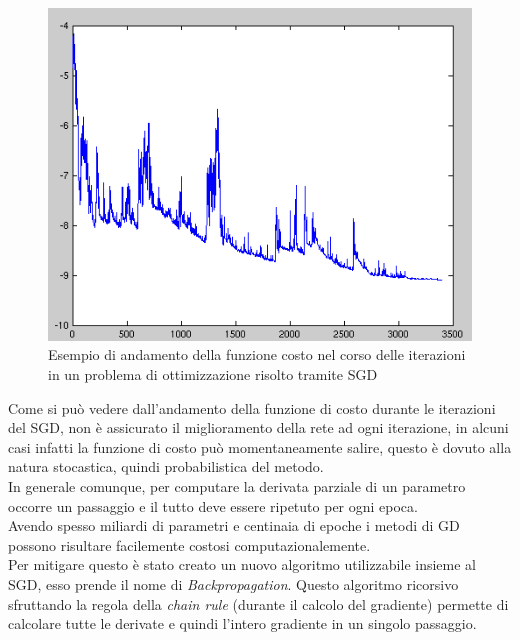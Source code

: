 \documentclass[12pt,a4paper,openright,twoside]{report}
\begin{document}
\begin{figure}[h]
\centering
\includegraphics[width=\linewidth]{Stogra.png}
\caption{Esempio di andamento della funzione costo nel corso delle iterazioni in un problema di ottimizzazione risolto tramite SGD}
\end{figure}
\newpage
Come si può vedere dall'andamento della funzione di costo durante le iterazioni del SGD, non è assicurato il miglioramento della rete ad ogni iterazione, in alcuni casi infatti la funzione di costo può momentaneamente salire, questo è dovuto alla natura stocastica, quindi probabilistica del metodo.\\
In generale comunque, per computare la derivata parziale di un parametro occorre un passaggio e il tutto deve essere ripetuto per ogni epoca. \\
Avendo spesso miliardi di parametri e centinaia di epoche i metodi di GD possono risultare facilemente costosi computazionalemente. \\
Per mitigare questo è stato creato un nuovo algoritmo utilizzabile insieme al SGD, esso prende il nome di \emph{Backpropagation}\cite{backprop}.
Questo algoritmo ricorsivo sfruttando la regola della \emph{chain rule} (durante il calcolo del gradiente) permette di calcolare tutte le derivate e quindi l'intero gradiente in un singolo passaggio.\\
\end{document}
